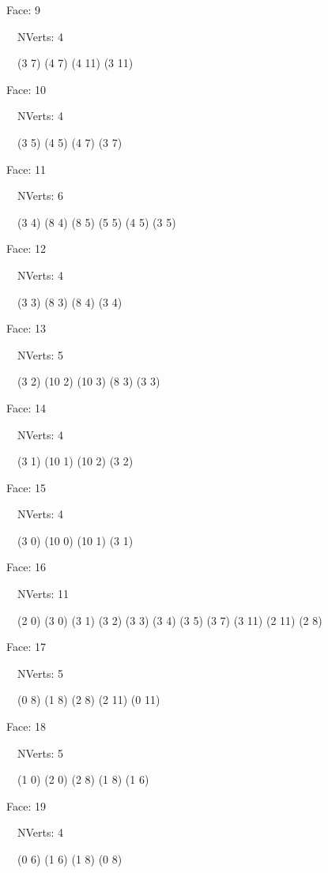 \documentclass{article}
\begin{document}
{\footnotesize 

Face: 9

\   \    NVerts: 4

 \   \   (3 7) (4 7) (4 11) (3 11)}

{\footnotesize 

Face: 10

\   \    NVerts: 4

 \   \   (3 5) (4 5) (4 7) (3 7)}

{\footnotesize 

Face: 11

\   \    NVerts: 6

 \   \   (3 4) (8 4) (8 5) (5 5) (4 5) (3 5)}

{\footnotesize 

Face: 12

\   \    NVerts: 4

 \   \   (3 3) (8 3) (8 4) (3 4)}

{\footnotesize 

Face: 13

\   \    NVerts: 5

 \   \   (3 2) (10 2) (10 3) (8 3) (3 3)}

{\footnotesize 

Face: 14

\   \    NVerts: 4

 \   \   (3 1) (10 1) (10 2) (3 2)}

{\footnotesize 

Face: 15

\   \    NVerts: 4

 \   \   (3 0) (10 0) (10 1) (3 1)}

{\footnotesize 

Face: 16

\   \    NVerts: 11

 \   \   (2 0) (3 0) (3 1) (3 2) (3 3) (3 4) (3 5) (3 7) (3 11) (2 11) (2 8)}

{\footnotesize 

Face: 17

\   \    NVerts: 5

 \   \   (0 8) (1 8) (2 8) (2 11) (0 11)}

{\footnotesize 

Face: 18

\   \    NVerts: 5

 \   \   (1 0) (2 0) (2 8) (1 8) (1 6)}

{\footnotesize 

Face: 19

\   \    NVerts: 4

 \   \   (0 6) (1 6) (1 8) (0 8)}
\end{document}
